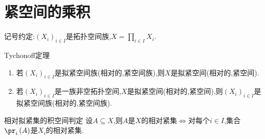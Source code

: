 \section{紧空间的乘积}

记号约定:$\left(X_{i}\right)_{i\in I}$是拓扑空间族,$X=\prod\limits_{i\in I}X_{i}$.

\begin{theorem}{Tychonoff定理}{}
	\begin{enumerate}
		\item 若$\left(X_{i}\right)_{i\in I}$是拟紧空间族(相对的,紧空间族),则$X$是拟紧空间(相对的,紧空间).
		\item 若$\left(X_{i}\right)_{i\in I}$是一族非空拓扑空间,$X$是拟紧空间(相对的,紧空间),则$\left(X_{i}\right)_{i\in I}$是拟紧空间族(相对的,紧空间族).
	\end{enumerate}
\end{theorem}

\begin{corollary}{相对拟紧集的积空间判定}{}
	设$A\subseteq X$,则$A$是$X$的相对紧集$\iff$对每个$i\in I$,集合$\pr_{i}\left(A\right)$是$X_{i}$的相对紧集.
\end{corollary}